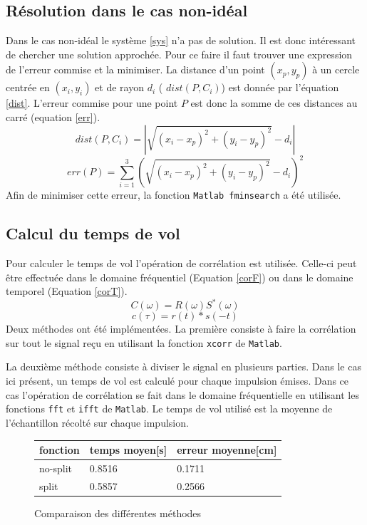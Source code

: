 \documentclass[10pt,a4paper]{article}
\begin{document}
\subsection{Résolution dans le cas non-idéal}
Dans le cas non-idéal le système \ref{sys} n'a pas de solution. Il est donc intéressant de chercher une solution approchée. Pour ce faire il faut trouver une expression de l'erreur commise et la minimiser. La distance d'un point $(x_p , y_p)$ à un cercle centrée en $(x_i , y_i)$ et de rayon $d_i$ ( $dist(P , C_i)$) est donnée par l'équation \ref{dist}. L'erreur commise pour une point $P$ est donc la somme de ces distances au carré (equation \ref{err}). 
\begin{equation}
dist(P , C_i)= |{\sqrt{(x_i-x_p)^2 +(y_i - y_p)^2} - d_i}| 
\label{dist}
\end{equation}
\begin{equation}
\label{err}
err(P) = \sum _{i=1} ^{3} (\sqrt{(x_i-x_p)^2 +(y_i - y_p)^2} - d_i)^2
\end{equation}
Afin de minimiser cette erreur, la fonction \texttt{Matlab fminsearch} a été utilisée. 
\subsection{Calcul du temps de vol}
Pour calculer le temps de vol l'opération de corrélation est utilisée. Celle-ci peut être effectuée dans le domaine fréquentiel (Equation \ref{corF}) ou dans le domaine temporel (Equation \ref{corT}). 
\begin{equation}
\label{corF}
C(\omega) = R(\omega)S^*(\omega)
\end{equation}
\begin{equation}
\label{corT}
c(\tau) = r(t)*s(-t)
\end{equation}
Deux méthodes ont été implémentées. La première consiste à faire la corrélation sur tout le signal reçu en utilisant la fonction \texttt{xcorr} de \texttt{Matlab}.

La deuxième méthode consiste à diviser le signal en plusieurs parties. Dans le cas ici présent, un temps de vol est calculé pour chaque impulsion émises. Dans ce cas l'opération de corrélation se fait dans le domaine fréquentielle en utilisant les fonctions \texttt{fft} et \texttt{ifft} de \texttt{Matlab}. Le temps de vol utilisé est la moyenne de l'échantillon récolté sur chaque impulsion.
\begin{figure}
\centering
\begin{tabular}{|l|l|l|}
\hline
fonction & temps moyen[s] & erreur moyenne[cm] \\
\hline
no-split & 0.8516 & 0.1711 \\
split & 0.5857 & 0.2566 \\
\hline
\end{tabular}
\caption{Comparaison des différentes méthodes}
\end{figure}
\end{document}
